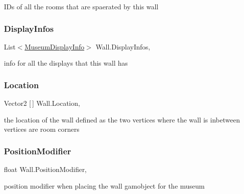 I\+Ds of all the rooms that are spaerated by this wall 

\mbox{\label{class_wall_a5fc68c5010cd944a5103f84a749e87f7}} 
\subsubsection{\texorpdfstring{Display\+Infos}{DisplayInfos}}
{\footnotesize\ttfamily List$<$\mbox{\hyperlink{class_museum_display_info}{Museum\+Display\+Info}}$>$ Wall.\+Display\+Infos\hspace{0.3cm}{\ttfamily [get]}, {}}



info for all the displays that this wall has 

\mbox{\label{class_wall_ac7769d0a497da7e7ae3a11c813645b7a}} 
\subsubsection{\texorpdfstring{Location}{Location}}
{\footnotesize\ttfamily Vector2 \mbox{[}$\,$\mbox{]} Wall.\+Location\hspace{0.3cm}{\ttfamily [get]}, {}}



the location of the wall defined as the two vertices where the wall is inbetween vertices are room corners 

\mbox{\label{class_wall_ae056b7b9068536491c1ac441a25824a0}} 
\subsubsection{\texorpdfstring{Position\+Modifier}{PositionModifier}}
{\footnotesize\ttfamily float Wall.\+Position\+Modifier\hspace{0.3cm}{\ttfamily [get]}, {}}



position modifier when placing the wall gamobject for the museum 

\mbox{\label{class_wall_aa2d6c86c7ccabbb5e317b9ccac62e99e}} 
